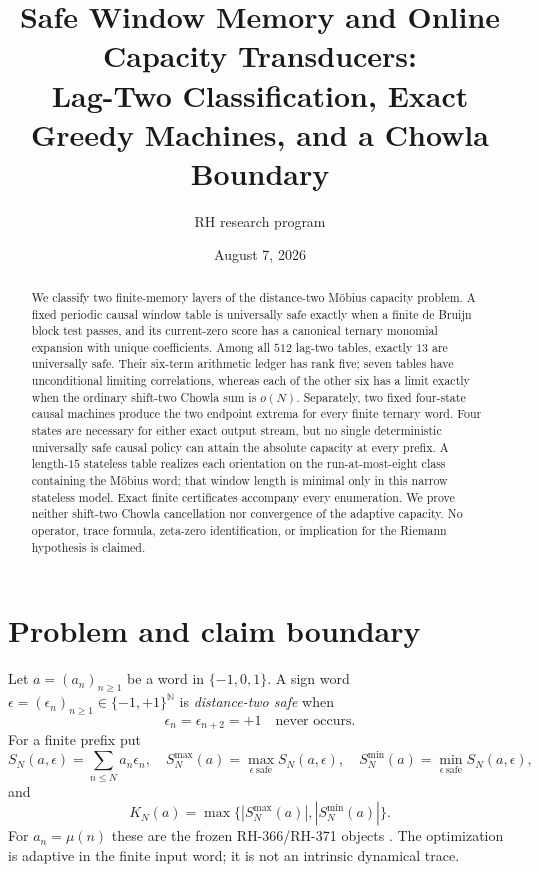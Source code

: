 \documentclass[11pt]{article}
\title{Safe Window Memory and Online Capacity Transducers:\\
Lag-Two Classification, Exact Greedy Machines, and a Chowla Boundary}
\author{RH research program}
\date{August 7, 2026}
\theoremstyle{definition}
\theoremstyle{remark}
\newcommand{\mob}{\mu}
\newcommand{\TT}{\{-1,0,1\}}
\newcommand{\SSS}{\{-1,+1\}}
\begin{document}
\maketitle

\begin{abstract}
We classify two finite-memory layers of the distance-two M\"obius capacity
problem.  A fixed periodic causal window table is universally safe exactly
when a finite de Bruijn block test passes, and its current-zero score has a
canonical ternary monomial expansion with unique coefficients.  Among all
$512$ lag-two tables, exactly $13$
are universally safe.  Their six-term arithmetic ledger has rank five; seven
tables have unconditional limiting correlations, whereas each of the other
six has a limit exactly when the ordinary shift-two Chowla sum is $o(N)$.
Separately, two fixed four-state causal machines produce the two endpoint
extrema for every finite ternary word.  Four states are necessary for either
exact output stream, but no single deterministic universally safe causal policy can attain
the absolute capacity at every prefix.  A length-$15$ stateless table realizes
each orientation on the run-at-most-eight class containing the M\"obius word;
that window length is minimal only in this narrow stateless model.  Exact
finite certificates accompany every enumeration.  We prove neither
shift-two Chowla cancellation nor convergence of the adaptive capacity.
No operator, trace formula, zeta-zero identification, or implication for the
Riemann hypothesis is claimed.
\end{abstract}

\section{Problem and claim boundary}

Let $a=(a_n)_{n\ge1}$ be a word in $\TT$.  A sign word
$\epsilon=(\epsilon_n)_{n\ge1}\in\SSS^{\mathbb N}$ is
\emph{distance-two safe} when
\begin{equation}
       \epsilon_n=\epsilon_{n+2}=+1\quad\text{never occurs}.
       \label{eq:safety}
\end{equation}
For a finite prefix put
\[
 S_N(a,\epsilon)=\sum_{n\le N}a_n\epsilon_n,
 \quad S_N^{\max}(a)=\max_{\epsilon\ \mathrm{safe}}S_N(a,\epsilon),
 \quad S_N^{\min}(a)=\min_{\epsilon\ \mathrm{safe}}S_N(a,\epsilon),
\]
and
\begin{equation}
                 K_N(a)=\max\{|S_N^{\max}(a)|,|S_N^{\min}(a)|\}.
                 \label{eq:capacity}
\end{equation}
For $a_n=\mob(n)$ these are the frozen RH-366/RH-371 objects
\cite{RH366,RH371}.  The optimization is adaptive in the finite input word;
it is not an intrinsic dynamical trace.
\end{document}
